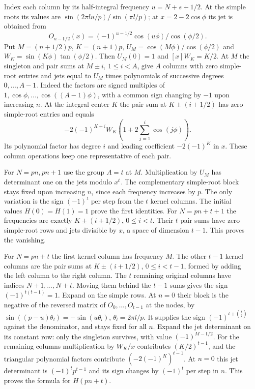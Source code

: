 \documentclass[11pt,a4paper]{article}
\begin{document}
Index each column by its half-integral frequency $u=N+s+1/2$. At the simple roots its values are $\sin(2\pi l u/p)/\sin(\pi l/p)$; at $x=2-2\cos\phi$ its jet is obtained from
\[
 O_{u-1/2}(x)=(-1)^{u-1/2}\cos(u\phi)/\cos(\phi/2).
\]
Put $M=(n+1/2)p$, $K=(n+1)p$, $U_M=\cos(M\phi)/\cos(\phi/2)$ and
$W_K=\sin(K\phi)\tan(\phi/2)$. Then $U_M(0)=1$ and $[x]W_K=K/2$.
At $M$ the singleton and pair sums at $M\pm i$, $1\le i<A$, give $A$ columns with zero simple-root entries and jets equal to $U_M$ times polynomials of successive degrees $0,\ldots,A-1$. Indeed the factors are signed multiples of $1,\cos\phi,\ldots,\cos((A-1)\phi)$, with a common sign changing by $-1$ upon increasing $n$. At the integral center $K$ the pair sum at $K\pm(i+1/2)$ has zero simple-root entries and equals
\[
 -2(-1)^{K+i}W_K\left(1+2\sum_{j=1}^i\cos(j\phi)\right).
\]
Its polynomial factor has degree $i$ and leading coefficient $-2(-1)^K$ in $x$. These column operations keep one representative of each pair.

For $N=pn,pn+1$ use the group $A=t$ at $M$. Multiplication by $U_M$ has determinant one on the jets modulo $x^t$. The complementary simple-root block stays fixed upon increasing $n$, since each frequency increases by $p$. The only variation is the sign $(-1)^t$ per step from the $t$ kernel columns. The initial values $H(0)=H(1)=1$ prove the first identities. For $N=pn+t+1$ the frequencies are exactly $K\pm(i+1/2)$, $0\le i<t$. Their $t$ pair sums have zero simple-root rows and jets divisible by $x$, a space of dimension $t-1$. This proves the vanishing.

For $N=pn+t$ the first kernel column has frequency $M$. The other $t-1$ kernel columns are the pair sums at $K\pm(i+1/2)$, $0\le i<t-1$, formed by adding the left column to the right column. The $t$ remaining original columns have indices $N+1,\ldots,N+t$. Moving them behind the $t-1$ sums gives the sign $(-1)^{t(t-1)}=1$. Expand on the simple rows. At $n=0$ their block is the negative of the reversed matrix of $O_0,\ldots,O_{t-1}$ at the nodes, by $\sin((p-u)\theta_l)=-\sin(u\theta_l)$, $\theta_l=2\pi l/p$. It supplies the sign $(-1)^{t+\binom t2}$ against the denominator, and stays fixed for all $n$. Expand the jet determinant on its constant row: only the singleton survives, with value $(-1)^{M-1/2}$. For the remaining columns multiplication by $W_K/x$ contributes $(K/2)^{t-1}$, and the triangular polynomial factors contribute $(-2(-1)^K)^{t-1}$. At $n=0$ this jet determinant is $(-1)^t p^{t-1}$ and its sign changes by $(-1)^t$ per step in $n$. This proves the formula for $H(pn+t)$.
\end{document}
